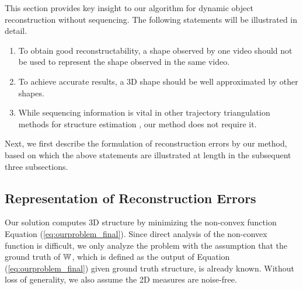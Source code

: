 This section provides key insight to our algorithm for dynamic object reconstruction without sequencing. %
The following statements will be illustrated in detail.
\begin{enumerate}
\item To obtain good reconstructability, a shape observed by one video should not be used to represent the shape observed in the same video. 
\item To achieve accurate results, a 3D shape should be well approximated by other shapes.
\item While sequencing information is vital in other trajectory triangulation methods for structure estimation \cite{Park_ECCV2010,Valmadre_CVPR2012}, our method does not require it.
\end{enumerate} 
Next, we first describe the formulation of reconstruction errors by our method, based on which the above statements are illustrated at length in the subsequent three subsections.

\subsection{Representation of Reconstruction Errors}
Our solution computes 3D structure by minimizing the non-convex function Equation (\ref{eq:ourproblem_final}).
Since direct analysis of the non-convex function is difficult, we only analyze the problem with the assumption that the ground truth of $\mathbb W$, which is defined as the output of Equation (\ref{eq:ourproblem_final}) given ground truth structure, is already known. 
Without loss of generality, we also assume the 2D measures are noise-free.

